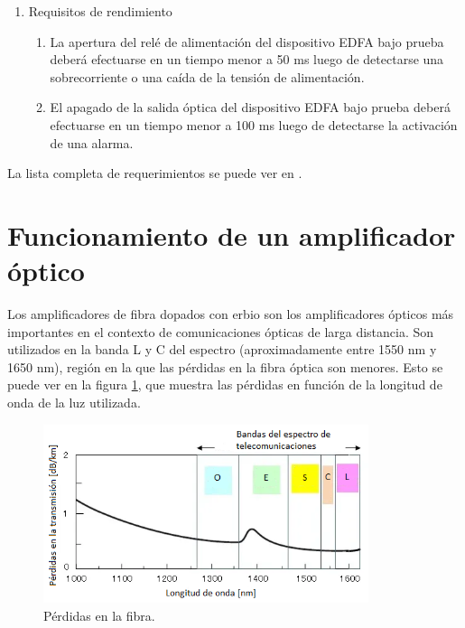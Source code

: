 \begin{enumerate}
\item Requisitos de rendimiento
	\begin{enumerate}
	\item \label{item:req1} La apertura del relé de alimentación del dispositivo EDFA 		bajo prueba deberá efectuarse en un tiempo menor a 50 ms luego de 		detectarse una sobrecorriente o una caída de la tensión de 				alimentación.
	\item \label{item:req2} El apagado de la salida óptica del dispositivo EDFA bajo 			prueba deberá efectuarse en un tiempo menor a 100 ms luego de 			detectarse la activación de una alarma.
	\end{enumerate}
	
\end{enumerate}

La lista completa de requerimientos se puede ver en \citep{DOC_REQ}.

\section{Funcionamiento de un amplificador óptico}
\label{sec:funcAmp}

Los amplificadores de fibra dopados con erbio son los amplificadores ópticos más importantes en el contexto de comunicaciones ópticas de larga distancia. Son utilizados en la banda L y C del espectro (aproximadamente entre 1550 nm y 1650 nm), región en la que las pérdidas en la fibra óptica son menores. Esto se puede ver en la figura \ref{fig:espectro}, que muestra las pérdidas en función de la longitud de onda de la luz utilizada.

\begin{figure}[H]
\centering
\includegraphics[width=0.85\textwidth]{./Figures/espectro.png}
\caption{Pérdidas en la fibra\protect\footnotemark.}
\label{fig:espectro}
\end{figure}


